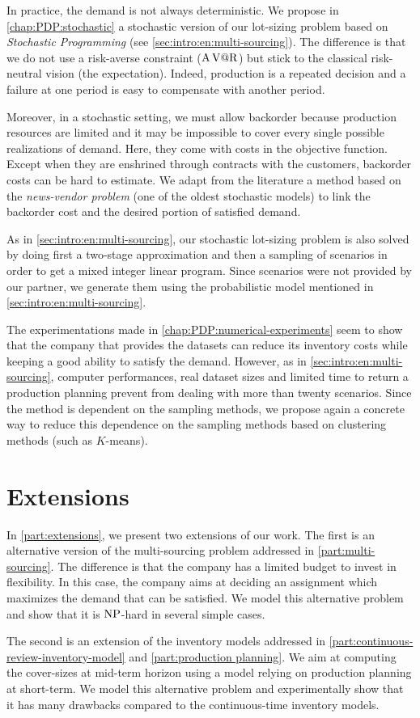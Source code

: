 \medskip


In practice, the demand is not always deterministic.
We propose in \cref{chap:PDP:stochastic} a stochastic version of our lot-sizing problem based on \emph{Stochastic Programming} (see \cref{sec:intro:en:multi-sourcing}).
The difference is that we do not use a risk-averse constraint ($\operatorname{A\operatorname{V@R}}$) but stick to the classical risk-neutral vision (the expectation).
Indeed, production is a repeated decision and a failure at one period is easy to compensate with another period.


Moreover, in a stochastic setting, we must allow backorder because production resources are limited and it may be impossible to cover every single possible realizations of demand.
Here, they come with costs in the objective function.
Except when they are enshrined through contracts with the customers, backorder costs can be hard to estimate.
We adapt from the literature a method based on the \emph{news-vendor problem} (one of the oldest stochastic models) to link the backorder cost and the desired portion of satisfied demand.


As in \cref{sec:intro:en:multi-sourcing}, our stochastic lot-sizing problem is also solved by doing first a two-stage approximation and then a sampling of scenarios in order to get a mixed integer linear program.
Since scenarios were not provided by our partner, we generate them using the probabilistic model mentioned in \cref{sec:intro:en:multi-sourcing}.


\medskip


The experimentations made in \cref{chap:PDP:numerical-experiments} seem to show that the company that provides the datasets can reduce its inventory costs while keeping a good ability to satisfy the demand.
However, as in \cref{sec:intro:en:multi-sourcing}, computer performances, real dataset sizes and limited time to return a production planning prevent from dealing with more than twenty scenarios.
Since the method is dependent on the sampling methods, we propose again a concrete way to reduce this dependence on the sampling methods based on clustering methods (such as $K$-means).


\section{Extensions}


In \cref{part:extensions}, we present two extensions of our work.
The first is an alternative version of the multi-sourcing problem addressed in \cref{part:multi-sourcing}.
The difference is that the company has a limited budget to invest in flexibility.
In this case, the company aims at deciding an assignment which maximizes the demand that can be satisfied.
We model this alternative problem and show that it is $\operatorname{NP}$-hard in several simple cases.


The second is an extension of the inventory models addressed in \cref{part:continuous-review-inventory-model} and \ref{part:production planning}.
We aim at computing the cover-sizes at mid-term horizon using a model relying on production planning at short-term.
We model this alternative problem and experimentally show that it has many drawbacks compared to the continuous-time inventory models.

